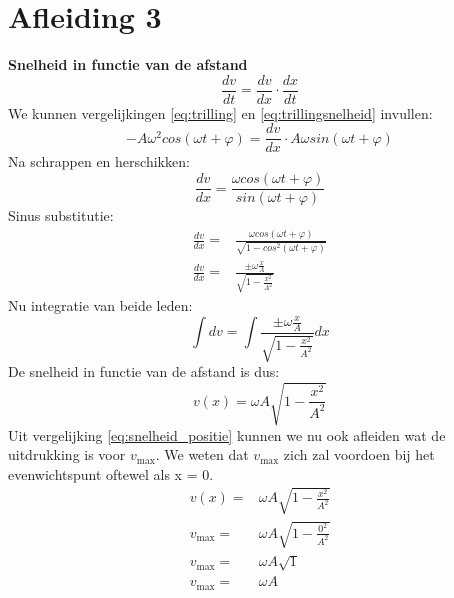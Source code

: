 \documentclass[a4paper,kul]{kulakarticle} %
\begin{document}
\section{Afleiding 3}
\textbf{Snelheid in functie van de afstand}
\begin{equation*}
	\frac{dv}{dt} = \frac{dv}{dx}\cdot\frac{dx}{dt}
\end{equation*}
We kunnen vergelijkingen \ref{eq:trilling} en \ref{eq:trillingsnelheid} invullen:
\begin{equation*}
	-A\omega^2cos(\omega t + \varphi) = \frac{dv}{dx}\cdot A\omega sin(\omega t +\varphi)
\end{equation*}
Na schrappen en herschikken:
\begin{equation*}
	\frac{dv}{dx} = \frac{\omega cos(\omega t + \varphi)}{sin(\omega t + \varphi)}
\end{equation*}
Sinus substitutie:
\begin{align*}
	\frac{dv}{dx} =& \frac{\omega cos(\omega t + \varphi)}{\sqrt{1-cos^2(\omega t + \varphi)}}\\
	\frac{dv}{dx} =& \frac{\pm \omega \frac{x}{A}}{\sqrt{1-\frac{x^2}{A^2}}}
\end{align*}
Nu integratie van beide leden:
\begin{equation*}
	\int dv = \int \frac{\pm \omega \frac{x}{A}}{\sqrt{1-\frac{x^2}{A^2}}} dx
\end{equation*}
De snelheid in functie van de afstand is dus:
\begin{equation}
	\label{eq:snelheid_positie}
	v(x) = \omega A\sqrt{1-\frac{x^2}{A^2}}
\end{equation}
Uit vergelijking \ref{eq:snelheid_positie} kunnen we nu ook afleiden wat de uitdrukking is voor $v_{\text{max}}$. We weten dat $v_{\text{max}}$ zich zal voordoen bij het evenwichtspunt oftewel als x = 0.
\begin{align*}
	v(x) =& \omega A\sqrt{1-\frac{x^2}{A^2}}\\
	v_{\text{max}} =& \omega A\sqrt{1-\frac{0^2}{A^2}}\\
	v_{\text{max}} =& \omega A\sqrt{1}\\
	v_{\text{max}} =& \omega A
\end{align*}
\newpage
\end{document}
